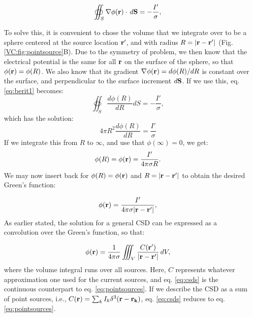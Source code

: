 \begin{equation}
\oiint_{S} \nabla\phi({\bf r}) \cdot \, d{\bf S}  = - \frac{I'}{\sigma},
\label{eq:berit1}
\end{equation}

To solve this, it is convenient to chose the volume that we integrate over to be a sphere centered at the source location ${\bf r'}$, and with radius $R = |{\bf r-r'}|$ (Fig. \ref{VC:fig:pointsource}B). Due to the symmetry of problem, we then know that the electrical potential is the same for all ${\bf r}$ on the surface of the sphere, so that $\phi({\bf r}) = \phi(R)$. We also know that its gradient $\nabla\phi({\bf r}) = d\phi(R)/dR$ is constant over the surface, and perpendicular to the surface increment $d{\bf S}$. If we use this, eq. \ref{eq:berit1} becomes:
\begin{equation}
\oiint_{S} \frac{d\phi(R)}{dR} d{S}  = - \frac{I'}{\sigma},
\label{eq:berit1ogenhalv}
\end{equation}
which has the solution:
\begin{equation}
4\pi R^2 \frac{d\phi(R)}{dR} = \frac{I'}{\sigma}
\label{eq:berit2}
\end{equation}
If we integrate this from $R$ to $\infty$, and use that $\phi(\infty) = 0$, we get:
\begin{equation}
\phi(R) = \phi({\bf r}) = \frac{I'}{4\pi \sigma R}.
\label{eq:berit3}
\end{equation}
We may now insert back for $\phi(R)= \phi({\bf r})$ and $R = |{\bf r-r'}|$ to obtain the desired Green's function:

\begin{equation}
\phi({\bf r})= \frac{I'}{4\pi \sigma |{\bf r-r'}|},
\label{eq:berit4}
\end{equation}
As earlier stated, the solution for a general CSD can be expressed as a convolution over the Green's function, so that:

\begin{equation}
\phi({\bf r}) = \frac{1}{4\pi \sigma}\iiint_V \frac{C({\bf r'})}{|{\bf r}-{\bf r'}|} \,dV, 
\label{eq:csds}
\end{equation}
where the volume integral runs over all sources. Here, $C$ represents whatever approximation one used for the current sources, and eq. \ref{eq:csds} is the continuous counterpart to eq. \ref{eq:pointsources}. If we describe the CSD as a sum of point sources, i.e.,  $C({\bf r}) = \sum_k I_k \delta^3({\bf r} - {\bf r_k})$, eq. \ref{eq:csds} reduces to eq.\ref{eq:pointsources}.




